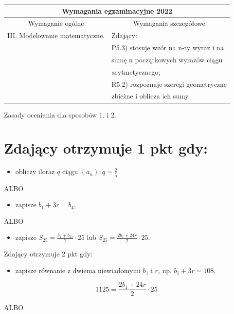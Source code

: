 \documentclass[10pt]{article}
\begin{document}
\begin{center}
\begin{tabular}{|l|l|}
\hline
\multicolumn{2}{|c|}{Wymagania egzaminacyjne 2022} \\
\hline
\multicolumn{1}{|c|}{Wymaganie ogólne} & \multicolumn{1}{c|}{Wymagania szczegółowe} \\
\hline
III. Modelowanie matematyczne. & Zdający: \\
 & P5.3) stosuje wzór na n-ty wyraz i na \\
 & sumę n początkowych wyrazów ciągu \\
 & arytmetycznego; \\
 & R5.2) rozpoznaje szeregi geometryczne \\
 & zbieżne i oblicza ich sumy. \\
\hline
\end{tabular}
\end{center}

Zasady oceniania dla sposobów 1. i 2.

\section*{Zdający otrzymuje 1 pkt gdy:}
\begin{itemize}
  \item obliczy iloraz $q$ ciągu $\left(a_{n}\right): q=\frac{2}{5}$
\end{itemize}

ALBO

\begin{itemize}
  \item zapisze $b_{1}+3 r=b_{4}$,
\end{itemize}

ALBO

\begin{itemize}
  \item zapisze $S_{25}=\frac{b_{1}+b_{25}}{2} \cdot 25$ lub $S_{25}=\frac{2 b_{1}+24 r}{2} \cdot 25$.
\end{itemize}

Zdający otrzymuje 2 pkt gdy:

\begin{itemize}
  \item zapisze równanie z dwiema niewiadomymi $b_{1}$ i $r$, np. $b_{1}+3 r=108$,
\end{itemize}

$$
1125=\frac{2 b_{1}+24 r}{2} \cdot 25
$$

ALBO
\end{document}
